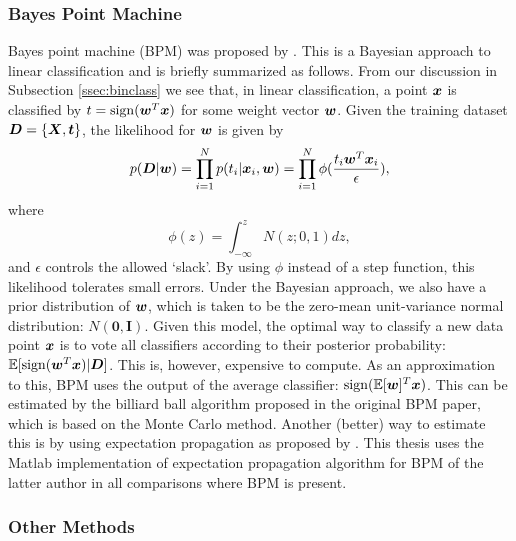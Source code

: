 \MYCOMMENT

\subsubsection{Bayes Point Machine}

Bayes point machine (BPM) was proposed by \cite{Herbrich}. This is a
Bayesian approach to linear classification and is briefly summarized
as follows. From our discussion in Subsection \ref{ssec:binclass} we
see that, in linear classification, a point $\boldsymbol{x}$ is classified by $t =
\operatorname{sign}(\boldsymbol{w}^T \boldsymbol{x})$ for some weight vector $\boldsymbol{w}$. Given the training
dataset $\boldsymbol{D} = \{\boldsymbol{X}, \boldsymbol{t} \}$, the likelihood for $\boldsymbol{w}$ is given by
$$p(\boldsymbol{D} | \boldsymbol{w}) = \prod_{i=1}^N p(t_i | \boldsymbol{x}_i, \boldsymbol{w}) = \prod_{i=1}^N
\phi(\frac{t_i\boldsymbol{w}^T\boldsymbol{x}_i}{\epsilon}),$$ where
$$\phi(z) = \int_{-\infty}^z N(z; 0, 1) dz,$$ and $\epsilon$ controls
the allowed `slack'. By using $\phi$ instead of a step function, this
likelihood tolerates small errors. Under the Bayesian approach, we
also have a prior distribution of $\boldsymbol{w}$, which is taken to be the
zero-mean unit-variance normal distribution: $N(\boldsymbol{0,
  I})$. Given this model, the optimal way to classify a new data point
$\boldsymbol{x}$ is to vote all classifiers according to their posterior
probability: $\mathbb{E}[\operatorname{sign}(\boldsymbol{w}^T \boldsymbol{x}) | \boldsymbol{D}]$. This is, however,
expensive to compute. As an approximation to this, BPM uses the output
of the average classifier: $\operatorname{sign}(\mathbb{E}[\boldsymbol{w}] ^T \boldsymbol{x})$. This can be
estimated by the billiard ball algorithm proposed in the original BPM
paper, which is based on the Monte Carlo method. Another (better) way
to estimate this is by using expectation propagation as proposed by
\cite{bpm}. This thesis uses the Matlab implementation of expectation
propagation algorithm for BPM of the latter author in all comparisons
where BPM is present.

\subsubsection{Other Methods}

